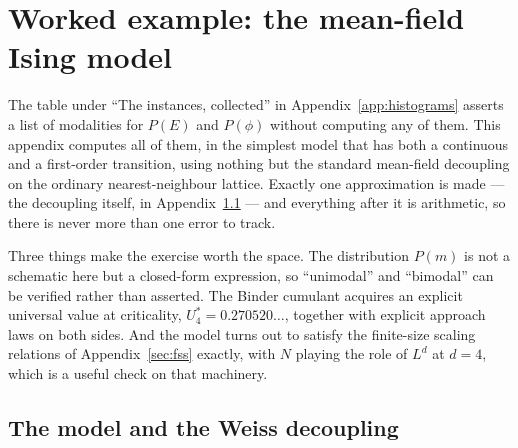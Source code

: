 \documentclass[10pt,a4paper]{article}
\theoremstyle{remark}
\begin{document}
\section{Worked example: the mean-field Ising model}
\label{sec:appising}

The table under ``The instances, collected'' in Appendix~\ref{app:histograms}
asserts a list of modalities for $P(E)$ and $P(\phi)$ without computing any of
them. This appendix computes all of them, in the simplest model that has both a
continuous and a first-order transition, using nothing but the standard mean-field
decoupling on the ordinary nearest-neighbour lattice. Exactly one approximation
is made --- the decoupling itself, in Appendix~\ref{sec:appising:model} --- and
everything after it is arithmetic, so there is never more than one error to
track.

Three things make the exercise worth the space. The distribution $P(m)$ is not a
schematic here but a closed-form expression, so ``unimodal'' and ``bimodal'' can be
verified rather than asserted. The Binder cumulant acquires an explicit universal
value at criticality, $U_4^{\ast}=0.270520\ldots$, together with explicit
approach laws on both sides. And the model turns out to satisfy the finite-size
scaling relations of Appendix~\ref{sec:fss} exactly, with $N$ playing the role of
$L^{d}$ at $d=4$, which is a useful check on that machinery.

\subsection{The model and the Weiss decoupling}
\label{sec:appising:model}
\end{document}
